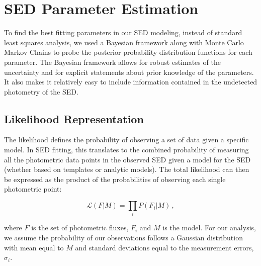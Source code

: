 \documentclass[fleqn, usenatbib]{mnras}
\begin{document}
\section{SED Parameter Estimation}\label{sec:sed_bayes}
To find the best fitting parameters in our SED modeling, instead of standard least squares analysis, we used a Bayesian framework along with Monte Carlo Markov Chains to probe the posterior probability distribution functions for each parameter. The Bayesian framework allows for robust estimates of the uncertainty and for explicit statements about prior knowledge of the parameters. It also makes it relatively easy to include information contained in the undetected photometry of the SED.

\subsection{Likelihood Representation}
The likelihood defines the probability of observing a set of data given a specific model. In SED fitting, this translates to the combined probability of measuring all the photometric data points in the observed SED given a model for the SED (whether based on templates or analytic models). The total likelihood can then be expressed as the product of the probabilities of observing each single photometric point:

\begin{equation}\label{eq:likelihood}
\mathcal{L}(F|M) = \prod_{i}P(F_i|M)\,,
\end{equation}

\noindent where $F$ is the set of photometric fluxes, $F_i$ and $M$ is the model. For our analysis, we assume the probability of our observations follows a Gaussian distribution with mean equal to $M$ and standard deviations equal to the measurement errors, $\sigma_{i}$.
\end{document}
